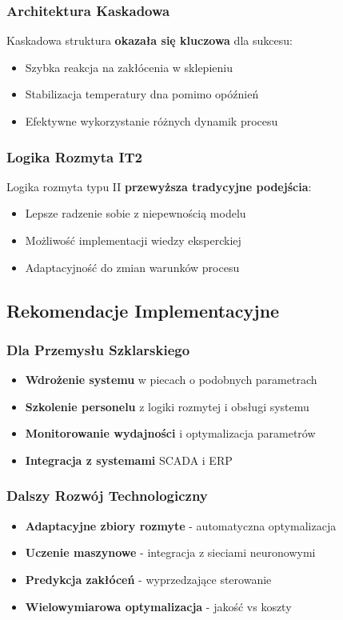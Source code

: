 \documentclass[12pt,a4paper]{article}
\begin{document}
\subsubsection{Architektura Kaskadowa}
Kaskadowa struktura \textbf{okazała się kluczowa} dla sukcesu:
\begin{itemize}
    \item Szybka reakcja na zakłócenia w sklepieniu
    \item Stabilizacja temperatury dna pomimo opóźnień
    \item Efektywne wykorzystanie różnych dynamik procesu
\end{itemize}

\subsubsection{Logika Rozmyta IT2}
Logika rozmyta typu II \textbf{przewyższa tradycyjne podejścia}:
\begin{itemize}
    \item Lepsze radzenie sobie z niepewnością modelu
    \item Możliwość implementacji wiedzy eksperckiej
    \item Adaptacyjność do zmian warunków procesu
\end{itemize}

\subsection{Rekomendacje Implementacyjne}

\subsubsection{Dla Przemysłu Szklarskiego}
\begin{itemize}
    \item \textbf{Wdrożenie systemu} w piecach o podobnych parametrach
    \item \textbf{Szkolenie personelu} z logiki rozmytej i obsługi systemu
    \item \textbf{Monitorowanie wydajności} i optymalizacja parametrów
    \item \textbf{Integracja z systemami} SCADA i ERP
\end{itemize}

\subsubsection{Dalszy Rozwój Technologiczny}
\begin{itemize}
    \item \textbf{Adaptacyjne zbiory rozmyte} - automatyczna optymalizacja
    \item \textbf{Uczenie maszynowe} - integracja z sieciami neuronowymi
    \item \textbf{Predykcja zakłóceń} - wyprzedzające sterowanie
    \item \textbf{Wielowymiarowa optymalizacja} - jakość vs koszty
\end{itemize}
\end{document}
